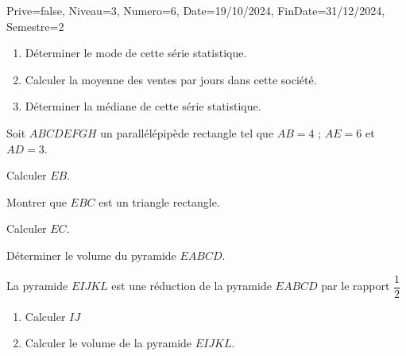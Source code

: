 \documentclass[a4paper,12pt]{article}
\begin{document}
\begin{Maquette}[DM]{Prive=false, Niveau=3, Numero=6, Date=19/10/2024, FinDate=31/12/2024, Semestre=2}
\begin{exercice}
\begin{minipage}{.5\linewidth}
\begin{enumerate}
\item Déterminer le mode de cette série statistique.
\item Calculer la moyenne des ventes par jours dans cette société.
\item Déterminer la médiane de cette série statistique. 
\end{enumerate}
\end{minipage}%
\begin{minipage}{.5\linewidth}
\end{minipage}
\end{exercice}

\begin{exercice}
Soit $ABCDEFGH$ un parallélépipède rectangle tel que $AB=4$ ; $AE=6$ et $AD=3$.
\begin{enumerate}
\begin{minipage}{.7\linewidth}
\item Calculer $EB$.
\item Montrer que $EBC$ est un triangle rectangle.
\item Calculer $EC$.
\item Déterminer le volume du pyramide $EABCD$.
\item La pyramide $EIJKL$ est une réduction de la pyramide $EABCD$ par le rapport $\dfrac{1}{2}$ 
\begin{enumerate}
\item Calculer $IJ$
\item Calculer le volume de la pyramide $EIJKL$.
\end{enumerate}
\end{minipage}%
\begin{minipage}{.3\linewidth}


\end{minipage}
\end{enumerate}
\end{exercice}

\end{Maquette}
\end{document}
